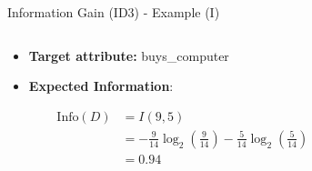 \begin{frame}{Information Gain (ID3) - Example (I)}
	\begin{columns}
		\begin{column}{0.45\textwidth}
			\begin{itemize}
				\item \textbf{Target attribute:} buys\_computer \medskip
				\item \textbf{Expected Information}:
			\end{itemize}
			{
			\footnotesize
			\begin{align*}
				\text{Info}(D) & = I(9,5)                                                               \\
				               & = - \frac{9}{14}\log_2(\frac{9}{14})-\frac{5}{14} \log_2(\frac{5}{14}) \\
				               & = 0.94                                                                 \\
			\end{align*}
			}
		\end{column}
		\begin{column}{0.45\textwidth}
			\vspace*{-0.5cm}
			\begin{center}
				\scalebox{0.7}{
					
				}
			\end{center}
		\end{column}
	\end{columns}
\end{frame}

